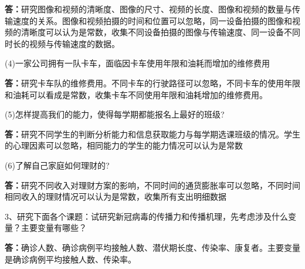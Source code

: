 \documentclass[UTF8,a4paper,12pt]{article} %
\begin{document}
\textbf{答：}研究图像和视频的清晰度、图像的尺寸、视频的长度、图像和视频的数量与传输速度的关系。图像和视频拍摄的时间和位置可以忽略，同一设备拍摄的图像和视频的清晰度可以认为是常数，收集不同设备拍摄的图像与传输速度、同一设备不同时长的视频与传输速度的数据。

(4)一家公司拥有一队卡车，面临因卡车使用年限和油耗而增加的维修费用 

\textbf{答：}研究卡车队的维修费用。不同卡车的行驶路径可以忽略，不同卡车的使用年限和油耗可以看成是常数，收集卡车不同使用年限和油耗增加的维修费用。

(5)怎样提高我们的能力，使得每学期都能报名上最好的班级? 

\textbf{答：}研究不同学生的判断分析能力和信息获取能力与每学期选课班级的情况。学生的心理因素可以忽略，相同能力的学生的能力情况可以认为是常数

(6)了解自己家庭如何理财的? 

\textbf{答：}研究不同收入对理财方案的影响，不同时间的通货膨胀率可以忽略，不同时间相同收入的理财情况可以认为是常数，收集所有支出明细数据

3、研究下面各个课题：试研究新冠病毒的传播力和传播机理，先考虑涉及什么变量？主要变量有哪些？

\textbf{答：}确诊人数、确诊病例平均接触人数、潜伏期长度、传染率、康复者。主要变量是确诊病例平均接触人数、传染率。
\end{document}
